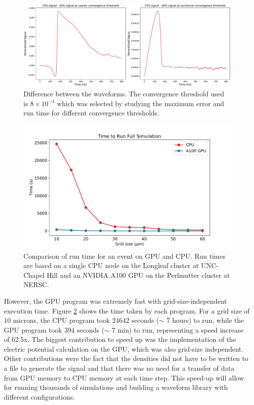 \begin{figure}[!ht]
\centering
 \includegraphics[width=0.99\linewidth]{ch4/figs/converge_threshold_dif.pdf}
\caption{Difference between the waveforms. The convergence threshold used is $8\times10^{-4}$ which was selected by studying the maximum error and run time for different convergence thresholds.}
\label{ch4_fig_cov_thres_diff} 
\end{figure}



\begin{figure}[!htb]
\centering
 \includegraphics[width=0.99\linewidth]{ch4/figs/cpu_gpu_comp.pdf}
\caption{ Comparison of run time for an {\ehd} event on GPU and CPU. Run times are based on a single CPU node on the Longleaf cluster at UNC-Chapel Hill and an NVIDIA A100 GPU on the Perlmutter cluster at NERSC.}
\label{fig:GPU_time}
\end{figure}


However, the GPU program was extremely fast with grid-size-independent execution time. Figure \ref{fig:GPU_time} shows the time taken by each program. For a grid size of $10$ microns, the CPU program took $24642$ seconds ($\sim$ 7 hours) to run, while the GPU program took $394$ seconds ($\sim$ 7 min) to run, representing a speed increase of 62.5x. The biggest contribution to speed up was the implementation of the electric potential calculation on the GPU, which was also grid-size independent. Other contributions were the fact that the densities did not have to be written to a file to generate the signal and that there was no need for a transfer of data from GPU memory to CPU memory at each time step. This speed-up will allow for running thousands of simulations and building a waveform library with different configurations.

